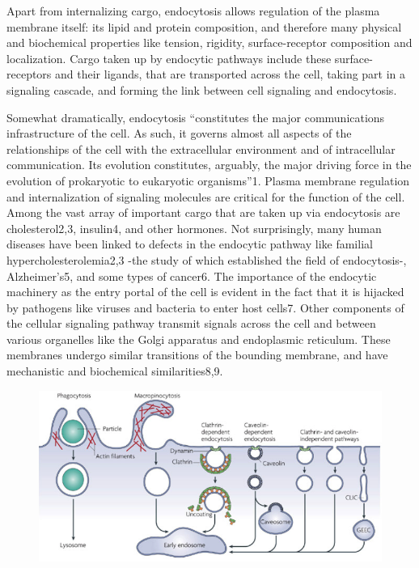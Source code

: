 Apart from internalizing cargo, endocytosis allows regulation of the plasma membrane itself: its lipid and protein composition, and therefore many physical and biochemical properties like tension, rigidity, surface-receptor composition and localization. Cargo taken up by endocytic pathways include these surface-receptors and their ligands, that are transported across the cell, taking part in a signaling cascade, and forming the link between cell signaling and endocytosis.


\vspace{5mm}
Somewhat dramatically, endocytosis “constitutes the major communications infrastructure of the cell. As such, it governs almost all aspects of the relationships of the cell with the extracellular environment and of intracellular communication. Its evolution constitutes, arguably, the major driving force in the evolution of prokaryotic to eukaryotic organisms”1.  Plasma membrane regulation and internalization of signaling molecules are critical for the function of the cell. Among the vast array of important cargo that are taken up via endocytosis are cholesterol2,3, insulin4, and other hormones. Not surprisingly, many human diseases have been linked to defects in the endocytic pathway like familial hypercholesterolemia2,3 -the study of which established the field of endocytosis-, Alzheimer’s5, and some types of cancer6. The importance of the endocytic machinery as the entry portal of the cell is evident in the fact that it is hijacked by pathogens like viruses and bacteria to enter host cells7. Other components of the cellular signaling pathway transmit signals across the cell and between various organelles like the Golgi apparatus and endoplasmic reticulum. These membranes undergo similar transitions of the bounding membrane, and have mechanistic and biochemical similarities8,9. 

\begin{figure}[H]
\centering
\includegraphics[scale=0.6]{figures/intro/fig2_screenshot}
\end{figure}



